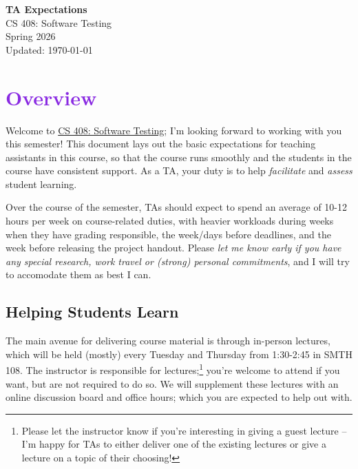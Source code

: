 \documentclass[letterpaper,11pt]{article}
\begin{document}
\begin{center}
	{\LARGE{\textbf{TA Expectations}}}\\
	  \vspace*{10pt}
	{\Large{CS 408: Software Testing}}\\
        \vspace*{5pt}
	{\Large{Spring 2026}}\\
        \vspace*{5pt}
        Updated: \today \\

  \vspace*{10pt}
\end{center}





\section*{\textcolor{BlueViolet}{Overview}}

Welcome to \underline{CS 408: Software Testing}; I'm looking forward
to working with you this semester! This document lays out the basic
expectations for teaching assistants in this course, so that the
course runs smoothly and the students in the course have consistent
support. As a TA, your duty is to help \emph{facilitate} and
\emph{assess} student learning.

Over the course of the semester, TAs should expect to spend an average
of 10-12 hours per week on course-related duties, with heavier
workloads during weeks when they have grading responsible, the
week/days before deadlines, and the week before releasing the project
handout. Please \emph{let me know early if you have any special
  research, work travel or (strong) personal commitments}, and I will
try to accomodate them as best I can.

\subsection*{Helping Students Learn}
The main avenue for delivering course material is through in-person
lectures, which will be held (mostly) every Tuesday and Thursday from
1:30-2:45 in SMTH 108. The instructor is responsible for
lectures;\footnote{Please let the instructor know if you're
  interesting in giving a guest lecture -- I'm happy for TAs to either
  deliver one of the existing lectures or give a lecture on a topic of
  their choosing!} you're welcome to attend if you want, but are not
required to do so. We will supplement these lectures with an online
discussion board and office hours; which you are expected to help out
with.
\end{document}
